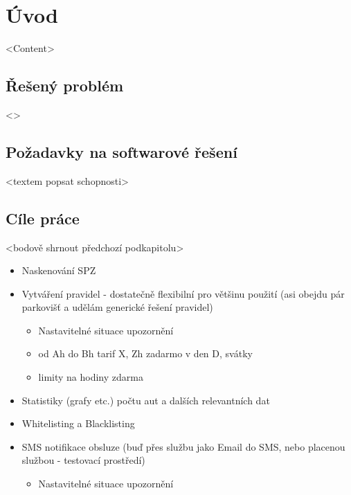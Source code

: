 
\chapter{Úvod} \label{uvod}

<Content>

\section{Řešený problém}

<>

\section{Požadavky na softwarové řešení}

<textem popsat schopnosti>
% 

\section{Cíle práce}

<bodově shrnout předchozí podkapitolu>

\begin{itemize}
  \item Naskenování SPZ
  \item Vytváření pravidel - dostatečně flexibilní pro většinu použití (asi obejdu pár parkovišť a udělám generické řešení pravidel)
    \begin{itemize}
      \item Nastavitelné situace upozornění
      \item od Ah do Bh tarif X, Zh zadarmo v den D, svátky
      \item limity na hodiny zdarma
    \end{itemize}
  \item Statistiky (grafy etc.) počtu aut a dalších relevantních dat
  \item Whitelisting a Blacklisting
  \item SMS notifikace obsluze (buď přes službu jako Email do SMS, nebo placenou službou - testovací prostředí)
      \begin{itemize}
        \item Nastavitelné situace upozornění
      \end{itemize}
  \end{itemize}